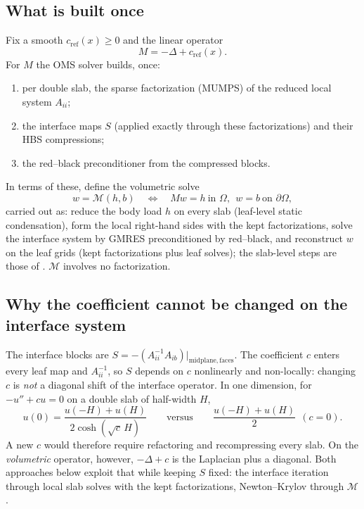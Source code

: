 \documentclass[11pt,a4paper]{article}
\theoremstyle{remark}\newtheorem{remark}{Remark}
\newcommand{\cR}{c_{\mathrm{ref}}}
\newcommand{\SolveM}{\mathcal{M}}
\begin{document}
\subsection{What is built once}
Fix a smooth $\cR(x)\ge0$ and the linear operator
\begin{equation}
  M=-\Delta+\cR(x).
\end{equation}
For $M$ the OMS solver builds, once:
\begin{enumerate}
  \item per double slab, the sparse factorization (MUMPS) of the reduced local system $A_{ii}$;
  \item the interface maps $S$ (applied exactly through these factorizations) and their HBS compressions;
  \item the red--black preconditioner from the compressed blocks.
\end{enumerate}
In terms of these, define the volumetric solve
\begin{equation}
  w=\SolveM(h,b)\quad\Longleftrightarrow\quad Mw=h\ \text{in }\Omega,\ \ w=b\ \text{on }\partial\Omega ,
\end{equation}
carried out as: reduce the body load $h$ on every slab (leaf-level static
condensation), form the local right-hand sides with the kept factorizations,
solve the interface system by GMRES preconditioned by red--black, and
reconstruct $w$ on the leaf grids (kept factorizations plus leaf solves);
the slab-level steps are those of . $\SolveM$ involves no factorization.

\subsection{Why the coefficient cannot be changed on the interface system}
The interface blocks are $S=-(A_{ii}^{-1}A_{ib})|_{\text{midplane},\,\text{faces}}$.
The coefficient $c$ enters every leaf map and $A_{ii}^{-1}$, so $S$ depends on
$c$ nonlinearly and non-locally: changing $c$ is \emph{not} a diagonal shift of
the interface operator. In one dimension, for $-u''+cu=0$ on a double slab of
half-width $H$,
\begin{equation}
  u(0)=\frac{u(-H)+u(H)}{2\cosh(\sqrt c\,H)}\qquad\text{versus}\qquad \frac{u(-H)+u(H)}{2}\ \ (c=0).
\end{equation}
A new $c$ would therefore require refactoring and recompressing every slab. On
the \emph{volumetric} operator, however, $-\Delta+c$ is the Laplacian plus a
diagonal. Both approaches below exploit that while keeping $S$ fixed: the
interface iteration through local slab solves with the kept factorizations,
Newton--Krylov through $\SolveM$.
\end{document}
